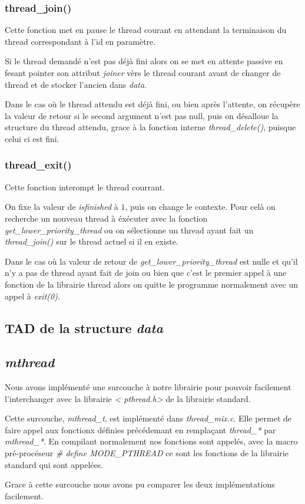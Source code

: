 \subsubsection{thread\_join()}
Cette fonction met en pause le thread courant en attendant la
terminaison du thread correspondant à l'id en paramètre.

Si le thread demandé n'est pas déjà fini alors on se met en attente
passive en fesant pointer son attribut \textit{joiner} vèrs le thread
courant avant de changer de thread et de stocker l'ancien dans
\textit{data}.

Dans le cas où le thread attendu est déjà fini, ou bien après
l'attente, on récupère la valeur de retour si le second argument n'est
pas null, puis on désalloue la structure du thread attendu, grace à la
fonction interne \textit{thread\_delete()}, puisque celui ci est fini.


\subsubsection{thread\_exit()}
Cette fonction interompt le thread courrant.

On fixe la valeur de \textit{isfinished} à $1$, puis on change le
contexte. Pour celà on recherche un nouveau thread à éxécuter avec la
fonction \textit{get\_lower\_priority\_thread} ou on sélectionne un
thread ayant fait un \textit{thread\_join()} sur le thread actuel si
il en existe.

Dans le cas où la valeur de retour de
\textit{get\_lower\_priority\_thread} est nulle et qu'il n'y a pas de
thread ayant fait de join ou bien que c'est le premier appel à une
fonction de la librairie thread alors on quitte le programme
normalement avec un appel à \textit{exit(0)}.


\subsection{TAD de la structure \textit{data}}




\subsection{\textit{mthread}}
Nous avons implémenté une surcouche à notre librairie pour pouvoir
facilement l'interchanger avec la librairie \textit{\textless
 pthread.h\textgreater} de la librairie standard.

Cette surcouche, \textit{mthread\_t}, est implémenté dans
\textit{thread\_mix.c}.  Elle permet de faire appel aux fonctionx
définies précédemant en remplaçant \textit{thread\_*} par
\textit{mthread\_*}. En compilant normalement nos fonctions sont
appelés, avec la macro pré-procéseur \textit{\# define MODE\_PTHREAD} ce
sont les fonctions de la librairie standard qui sont appelées.

Grace à cette surcouche nous avons pu comparer les deux implémentations facilement.

